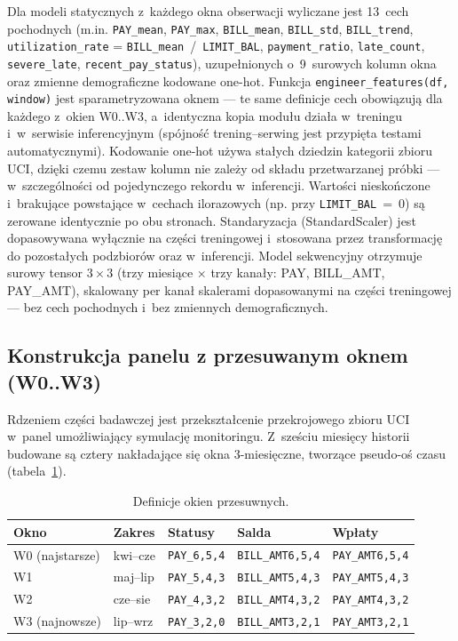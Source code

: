 Dla modeli statycznych z~każdego okna obserwacji wyliczane jest 13~cech
pochodnych (m.in. \texttt{PAY\_mean}, \texttt{PAY\_max}, \texttt{BILL\_mean},
\texttt{BILL\_std}, \texttt{BILL\_trend}, \texttt{utilization\_rate} =
\texttt{BILL\_mean}~/~\texttt{LIMIT\_BAL}, \texttt{payment\_ratio},
\texttt{late\_count}, \texttt{severe\_late}, \texttt{recent\_pay\_status}),
uzupełnionych o~9~surowych kolumn okna oraz zmienne demograficzne kodowane
one-hot. Funkcja \texttt{engineer\_features(df, window)} jest sparametryzowana
oknem --- te same definicje cech obowiązują dla każdego z~okien W0..W3,
a~identyczna kopia modułu działa w~treningu i~w~serwisie inferencyjnym (spójność
trening--serwing jest przypięta testami automatycznymi). Kodowanie one-hot używa
stałych dziedzin kategorii zbioru UCI, dzięki czemu zestaw kolumn nie zależy od
składu przetwarzanej próbki --- w~szczególności od pojedynczego rekordu
w~inferencji. Wartości nieskończone i~brakujące powstające w~cechach ilorazowych
(np. przy \texttt{LIMIT\_BAL}~=~0) są zerowane identycznie po obu stronach.
Standaryzacja (StandardScaler) jest dopasowywana wyłącznie na części treningowej
i~stosowana przez transformację do pozostałych podzbiorów oraz w~inferencji.
Model sekwencyjny otrzymuje surowy tensor $3\times3$ (trzy miesiące $\times$
trzy kanały: PAY, BILL\_AMT, PAY\_AMT), skalowany per kanał skalerami
dopasowanymi na części treningowej --- bez cech pochodnych i~bez zmiennych
demograficznych.

\subsection{Konstrukcja panelu z przesuwanym oknem (W0..W3)}

Rdzeniem części badawczej jest przekształcenie przekrojowego zbioru UCI w~panel
umożliwiający symulację monitoringu. Z~sześciu miesięcy historii budowane są
cztery nakładające się okna 3-miesięczne, tworzące pseudo-oś czasu
(tabela~\ref{tab:okna}).

\begin{table}[htbp]
\centering
\caption{Definicje okien przesuwnych.}
\label{tab:okna}
\begin{tabular}{lllll}
\toprule
Okno & Zakres & Statusy & Salda & Wpłaty \\
\midrule
W0 (najstarsze) & kwi--cze & \texttt{PAY\_6,5,4} & \texttt{BILL\_AMT6,5,4} & \texttt{PAY\_AMT6,5,4} \\
W1              & maj--lip & \texttt{PAY\_5,4,3} & \texttt{BILL\_AMT5,4,3} & \texttt{PAY\_AMT5,4,3} \\
W2              & cze--sie & \texttt{PAY\_4,3,2} & \texttt{BILL\_AMT4,3,2} & \texttt{PAY\_AMT4,3,2} \\
W3 (najnowsze)  & lip--wrz & \texttt{PAY\_3,2,0} & \texttt{BILL\_AMT3,2,1} & \texttt{PAY\_AMT3,2,1} \\
\bottomrule
\end{tabular}
\end{table}

